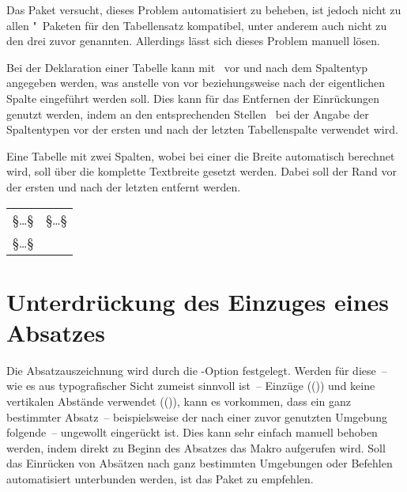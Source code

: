 Das Paket  versucht, dieses Problem automatisiert zu 
beheben, ist jedoch nicht zu allen "~Paketen für den 
Tabellensatz kompatibel, unter anderem auch nicht zu den drei zuvor genannten. 
Allerdings lässt sich dieses Problem manuell lösen. 

Bei der Deklaration einer Tabelle kann mit~\PParameter{\dots} vor und 
nach dem Spaltentyp angegeben werden, was anstelle von  vor 
beziehungsweise nach der eigentlichen Spalte eingeführt werden soll. Dies kann 
für das Entfernen der Einrückungen genutzt werden, indem an den entsprechenden 
Stellen~ bei der Angabe der Spaltentypen vor der ersten 
und nach der letzten Tabellenspalte verwendet wird.
%
\begin{Example}
Eine Tabelle mit zwei Spalten, wobei bei einer die Breite automatisch berechnet 
wird, soll über die komplette Textbreite gesetzt werden. Dabei soll der Rand 
vor der ersten und nach der letzten entfernt werden.
\begin{Code}[escapechar=§]
\begin{tabularx}{\textwidth}{@{}lX@{}}
§\dots§ & §\dots§ \tabularnewline
§\dots§
\end{tabularx}
\end{Code}
\end{Example}



\section{Unterdrückung des Einzuges eines Absatzes}
%
%
Die Absatzauszeichnung wird durch die \KOMAScript-Option
 festgelegt. 
Werden für diese~-- wie es aus typografischer Sicht zumeist sinnvoll ist~-- 
Einzüge (()) und keine vertikalen 
Abstände verwendet (()), kann es 
vorkommen, dass ein ganz bestimmter Absatz~-- beispielsweise der nach einer 
zuvor genutzten Umgebung folgende~-- ungewollt eingerückt ist. Dies kann sehr 
einfach manuell behoben werden, indem direkt zu Beginn des Absatzes das Makro 
 aufgerufen wird. Soll das Einrücken von Absätzen nach ganz 
bestimmten Umgebungen oder Befehlen automatisiert unterbunden werden, ist das 
Paket  zu empfehlen.




